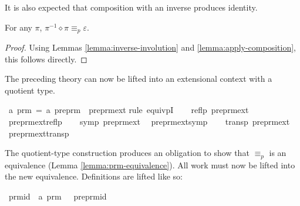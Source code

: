 It is also expected that composition with an inverse produces identity.

\begin{lemma}
\label{lemma:group-inverse}
For any \(\pi\), \(\pi^{-1} \diamond \pi \equiv_p \varepsilon\).
\end{lemma}
\begin{proof}
Using Lemmas \ref{lemma:inverse-involution} and \ref{lemma:apply-composition}, this follows directly.
\end{proof}

The preceding theory can now be lifted into an extensional context with a quotient type.

\begin{implementation}
\isamarkupfalse%
\ {\isacharprime}a\ prm\ =\ {\isachardoublequoteopen}{\isacharprime}a\ preprm{\isachardoublequoteclose}\ {\isacharslash}\ preprm{\isacharunderscore}ext\isanewline
%
\isatagproof
{}\isamarkupfalse%
{\isacharparenleft}rule\ equivpI{\isacharparenright}\isanewline
\ \ \isamarkupfalse%
\ {\isachardoublequoteopen}reflp\ preprm{\isacharunderscore}ext{\isachardoublequoteclose}\ \isamarkupfalse%
\ preprm{\isacharunderscore}ext{\isacharunderscore}reflp\isacommand{{\isachardot}}\isamarkupfalse%
\isanewline
\ \ \isamarkupfalse%
\ {\isachardoublequoteopen}symp\ preprm{\isacharunderscore}ext{\isachardoublequoteclose}\ \isamarkupfalse%
\ preprm{\isacharunderscore}ext{\isacharunderscore}symp\isacommand{{\isachardot}}\isamarkupfalse%
\isanewline
\ \ \isamarkupfalse%
\ {\isachardoublequoteopen}transp\ preprm{\isacharunderscore}ext{\isachardoublequoteclose}\ \isamarkupfalse%
\ preprm{\isacharunderscore}ext{\isacharunderscore}transp\isacommand{{\isachardot}}\isamarkupfalse%
\isanewline
{}\isamarkupfalse%
\endisatagproof
\end{implementation}

The quotient-type construction produces an obligation to show that \(\equiv_p\) is an equivalence (Lemma \ref{lemma:prm-equivalence}).
All work must now be lifted into the new equivalence.
Definitions are lifted like so:

\begin{implementation}
\isamarkupfalse%
\ prm{\isacharunderscore}id\ {\isacharcolon}{\isacharcolon}\ {\isachardoublequoteopen}{\isacharprime}a\ prm{\isachardoublequoteclose}\ {\isacharparenleft}{\isachardoublequoteopen}{\isasymepsilon}{\isachardoublequoteclose}{\isacharparenright}\ \ preprm{\isacharunderscore}id%
\end{implementation}

